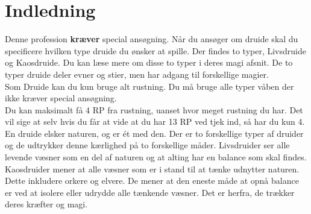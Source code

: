 \chapter{Indledning}

Denne profession \textbf{kræver} special ansøgning. Når du ansøger om druide skal du specificere hvilken type druide du ønsker at spille. Der findes to typer, Livsdruide og Kaosdruide. Du kan læse mere om disse to typer i deres magi afsnit.
De to typer druide deler evner og stier, men har adgang til forskellige magier.\\

Som Druide kan du kun bruge alt rustning. Du må bruge alle typer våben der ikke kræver special ansøgning.\\
Du kan maksimalt få 4 RP fra rustning, uanset hvor meget rustning du har. Det vil sige at selv hvis du får at vide at du har 13 RP ved tjek ind, så har du kun 4.\\

En druide elsker naturen, og er ét med den. Der er to forskellige typer af druider og de udtrykker denne kærlighed på to forskellige måder. Livsdruider ser alle levende væsner som en del af naturen og at alting har en balance som skal findes. Kaosdruider mener at alle væsner som er i stand til at tænke udnytter naturen. Dette inkludere orkere og elvere. De mener at den eneste måde at opnå balance er ved at isolere eller udrydde alle tænkende væsner. Det er herfra, de trækker deres kræfter og magi. 